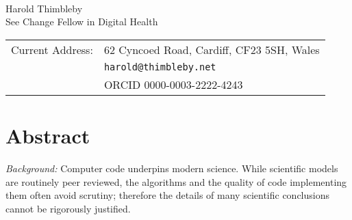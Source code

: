 

\renewcommand\thesubsection{(\thesection.\alph{subsection})}
\usepackage{hyperref}

\def\httpURL#1{\href{http://#1}{\textcolor{blue}{#1}}}
\def\LONGhttpURL#1#2{\href{http://#1}{\textcolor{blue}{#2}}}

\makeatletter
    \def\do@url@hyp{\do/}
    \usepackage{moreverb,url}
\makeatother









\vspace*{0.2in}

\begin{flushleft}
{\Large
\textbf\newline{\mytitle} %
}
\newline
\\
Harold Thimbleby
\\
\bigskip
See Change Fellow in Digital Health
\\
\bigskip


\begin{tabular}{@{}ll}Current Address: &62 Cyncoed Road, Cardiff, CF23 5SH, Wales\\
&\texttt{harold@thimbleby.net}\\
&ORCID 0000-0003-2222-4243
\end{tabular}


\end{flushleft}
\section*{Abstract}
\noindent
\emph{Background:} Computer code underpins modern science. While scientific models are routinely peer reviewed, the algorithms and the quality of code implementing them often avoid scrutiny; therefore the details of many scientific conclusions cannot be rigorously justified. 

